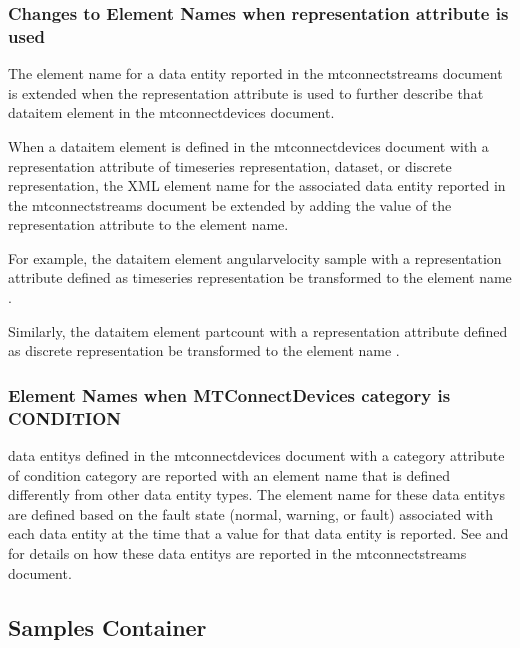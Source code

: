 \documentclass{mtconnect}	%
\providecommand{\DIFadd}[1]{{\hspace{0pt}\protect\color{blue}#1}} %
\providecommand{\DIFaddbegin}{} %
\providecommand{\DIFaddend}{} %
\begin{document}
\subsubsection{Changes to Element Names when representation attribute is used}

The \gls{element name} for a \gls{data entity} reported in the \gls{mtconnectstreams} document is extended when the \gls{representation} attribute is used to further describe that \gls{dataitem} element in the \gls{mtconnectdevices} document.

When a \gls{dataitem} element is defined in the \gls{mtconnectdevices} document with a \gls{representation} attribute of \gls{timeseries representation}\DIFaddbegin \DIFadd{, \gls{dataset}, }\DIFaddend or \gls{discrete representation}, the XML \gls{element name} for the associated \gls{data entity} reported in the \gls{mtconnectstreams} document \must be extended by adding the value of the \gls{representation} attribute to the \gls{element name}.

For example, the \gls{dataitem} element \gls{angularvelocity sample} with a \gls{representation} attribute defined as \gls{timeseries representation} \must be transformed to the \gls{element name} .

Similarly, the \gls{dataitem} element \gls{partcount} with a \gls{representation} attribute defined as \gls{discrete representation} \must be transformed to the \gls{element name} .

\subsubsection{Element Names when MTConnectDevices category is CONDITION}

\glspl{data entity} defined in the \gls{mtconnectdevices} document with a \gls{category} attribute of \gls{condition category} are reported with an \gls{element name} that is defined differently from other \gls{data entity} \glspl{type}.  The \gls{element name} for these \glspl{data entity} are defined based on the \gls{fault state} (\gls{normal}, \gls{warning}, or \gls{fault}) associated with each \gls{data entity} at the time that a value for that \gls{data entity} is reported.  See  and  for details on how these \glspl{data entity} are reported in the \gls{mtconnectstreams} document.

\subsection{Samples Container}
\end{document}
